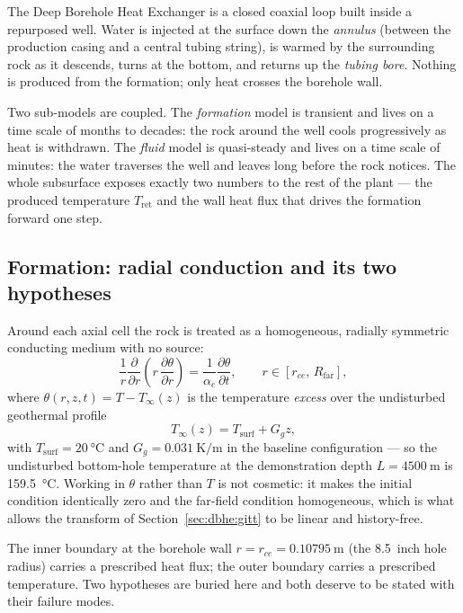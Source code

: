 \documentclass[11pt]{article}
\providecommand{\celsius}{\degreeCelsius}
\begin{document}
The Deep Borehole Heat Exchanger is a closed coaxial loop built inside a
repurposed well. Water is injected at the surface down the \emph{annulus}
(between the production casing and a central tubing string), is warmed by the
surrounding rock as it descends, turns at the bottom, and returns up the
\emph{tubing bore}. Nothing is produced from the formation; only heat crosses
the borehole wall.

Two sub-models are coupled. The \emph{formation} model is transient and lives on
a time scale of months to decades: the rock around the well cools progressively
as heat is withdrawn. The \emph{fluid} model is quasi-steady and lives on a time
scale of minutes: the water traverses the well and leaves long before the rock
notices. The whole subsurface exposes exactly two numbers to the rest of the
plant --- the produced temperature $T_{\mathrm{ret}}$ and the wall heat flux
that drives the formation forward one step.

\subsection{Formation: radial conduction and its two hypotheses}
\label{sec:dbhe:formation}

Around each axial cell the rock is treated as a homogeneous, radially symmetric
conducting medium with no source:
\begin{equation}
\frac{1}{r}\frac{\partial}{\partial r}\!\left(r\,\frac{\partial\theta}{\partial r}\right)
=\frac{1}{\alpha_e}\frac{\partial\theta}{\partial t}, \qquad
r\in[r_{ce},\,R_{\mathrm{far}}],
\label{eq:dbhe:radial}
\end{equation}
where $\theta(r,z,t)=T-T_\infty(z)$ is the temperature \emph{excess} over the
undisturbed geothermal profile
\begin{equation}
T_\infty(z)=T_{\mathrm{surf}}+G_g z ,
\label{eq:dbhe:Tinf}
\end{equation}
with $T_{\mathrm{surf}}=\SI{20}{\celsius}$ and $G_g=\SI{0.031}{\kelvin\per\metre}$
in the baseline configuration --- so the undisturbed bottom-hole temperature at
the demonstration depth $L=\SI{4500}{\metre}$ is \SI{159.5}{\celsius}. Working
in $\theta$ rather than $T$ is not cosmetic: it makes the initial condition
identically zero and the far-field condition homogeneous, which is what allows
the transform of Section~\ref{sec:dbhe:gitt} to be linear and history-free.

The inner boundary at the borehole wall $r=r_{ce}=\SI{0.10795}{\metre}$ (the
\SI{8.5}{inch} hole radius) carries a prescribed heat flux; the outer boundary
carries a prescribed temperature. Two hypotheses are buried here and both
deserve to be stated with their failure modes.
\end{document}
